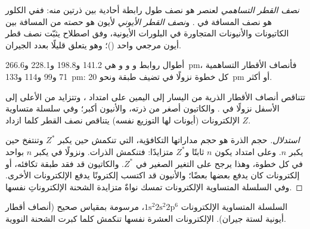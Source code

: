 \begin{definition}\label{def:b1:periodicity:radius}
\emph{نصف القطر التساهمي} لعنصر هو نصف
طول رابطة أحادية بين ذرتين منه: ففي الكلور هو نصف
المسافة  في . و\emph{نصف القطر
الأيوني} لأيون هو حصته من المسافة بين الكاتيونات
والأنيونات المتجاورة في البلورات الأيونية، وفق اصطلاح يثبّت نصف قطر
أيون مرجعي واحد
()؛ وهو يتعلق قليلًا بعدد الجيران.
\end{definition}

\begin{example}[الهالوجينات]\label{ex:b1:periodicity:halogen-radii}
أطوال روابط  و و و هي 141.2
و198.8 و228.1 و\qty{266.6}{pm}، فأنصاف الأقطار التساهمية 71 و99 و114
و\qty{133}{pm}: كل خطوة نزولًا في  تضيف طبقة ونحو
\qty{20}{pm} أو أكثر.
\end{example}

\begin{proposition}\label{prop:b1:periodicity:radius-trend}
تتناقص أنصاف الأقطار الذرية من اليسار إلى اليمين على امتداد ،
وتتزايد من الأعلى إلى الأسفل نزولًا في . والكاتيون أصغر من ذرته،
والأنيون أكبر؛ وفي سلسلة متساوية الإلكترونات (أيونات لها التوزيع
نفسه) يتناقص نصف القطر كلما ازداد $Z$.
\end{proposition}

\begin{proof}[استدلال]
حجم الذرة هو حجم مداراتها التكافؤية، التي تنكمش
حين يكبر $Z^{*}$ وتنتفخ حين يكبر $n$. وعلى امتداد  يكون $n$ ثابتًا
و$Z^{*}$ متزايدًا: فتنكمش الذرات. ونزولًا في  يكبر $n$ بواحد في
كل خطوة، وهذا يرجح على التغير الصغير في $Z^{*}$. والكاتيون قد فقد
طبقة تكافئه، أو إلكترونات كان يدفع بعضها بعضًا؛ والأنيون قد
اكتسب إلكترونًا يدفع الإلكترونات الأخرى. وفي السلسلة المتساوية الإلكترونات
تمسك نواةٌ متزايدة الشحنة الإلكتروناتِ نفسها.
\end{proof}

\begin{omfigure}

{\small السلسلة المتساوية الإلكترونات $1\text{s}^2 2\text{s}^2 2\text{p}^6$،
مرسومة بمقياس صحيح (أنصاف أقطار أيونية لستة جيران). الإلكترونات العشرة
نفسها تنكمش كلما كبرت الشحنة النووية.}
\end{omfigure}

